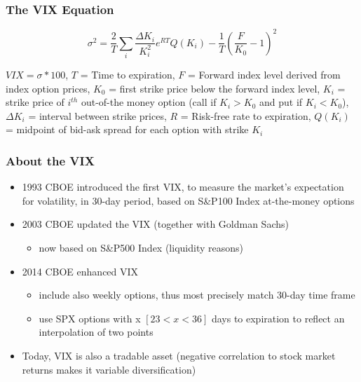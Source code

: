 \documentclass[aspectratio=169]{beamer}
\begin{document}
\begin{frame}
\frametitle{The VIX Equation}
	\begin{equation}
	\sigma^{2} = \frac{2}{T} \sum_{i} \frac{\Delta K_{i}}{K_{i}^{2}} e^{RT} Q(K_{i}) - \frac{1}{T} (\frac{F}{K_{0}} - 1)^{2}
	\end{equation}
	\begin{footnotesize}
	$VIX = \sigma*100$, $T$ = Time to expiration, $F$ = Forward index level derived from index option prices, $K_{0}$ = first strike price below the forward index level, $K_{i}$ = strike price of $i^{th}$ out-of-the money option (call if $K_{i} > K_{0}$ and put if $K_{i} < K_{0}$), $\Delta K_{i}$ = interval between strike prices, $R$ = Risk-free rate to expiration, $Q(K_{i})$ = midpoint of bid-ask spread for each option with strike $K_{i}$
	\end{footnotesize}
\end{frame}

\begin{frame}
\frametitle{About the VIX}
\begin{footnotesize}
\begin{itemize}
	\item 1993 CBOE introduced the first VIX, to measure the market's expectation for volatility, in 30-day period, based on S\&P100 Index at-the-money options
	\item 2003 CBOE updated the VIX (together with Goldman Sachs)
	\begin{itemize}
	\item now based on S\&P500 Index (liquidity reasons)
	\end{itemize}
	\item 2014 CBOE enhanced VIX
	\begin{itemize}
	\item include also weekly options, thus most precisely match 30-day time frame 
	\item use SPX options with x $[23<x<36]$ days to expiration to reflect an interpolation of two points
	\end{itemize}
	\item Today, VIX is also a tradable asset (negative correlation to stock market returns makes it variable diversification)
	\end{itemize}
	\end{footnotesize}
\end{frame}
\end{document}
